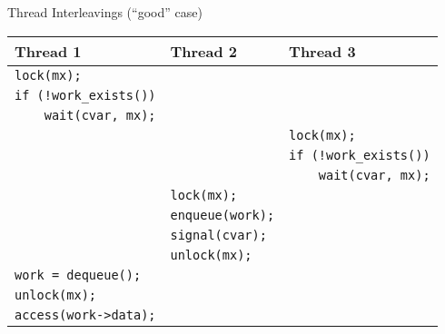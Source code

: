 \documentclass[xcolor=dvipsnames]{beamer}
\begin{document}
\begin{frame}{Thread Interleavings (``good'' case)}
	\begin{center}
		\begin{tabular}{|l|l|l|}
			\hline
			\cellcolor{thread1} {\bf Thread 1} & \cellcolor{thread2} {\bf Thread 2} & \cellcolor{thread3} {\bf Thread 3} \\
			\hline
			\small \texttt{lock(mx);} & & \\
			\small \texttt{if~(!work\_exists())} & & \\
			\small \texttt{~~~~wait(cvar,~mx);} & & \\
			
			& & \small \texttt{lock(mx);} \\
			& & \small \texttt{if~(!work\_exists())} \\
			& & \small \texttt{~~~~wait(cvar,~mx);} \\

			& \small \texttt{lock(mx);} & \\
			& \small \texttt{enqueue(work);} & \\
			& \small \texttt{signal(cvar);} & \\
			& \small \texttt{unlock(mx);} & \\
			
			\small \texttt{work~=~dequeue();~} & & \\
			\small \texttt{unlock(mx);} & & \\
			\small \texttt{access(work->data);}& & \\
			\hline
		\end{tabular}
	\end{center}
\end{frame}
\end{document}
